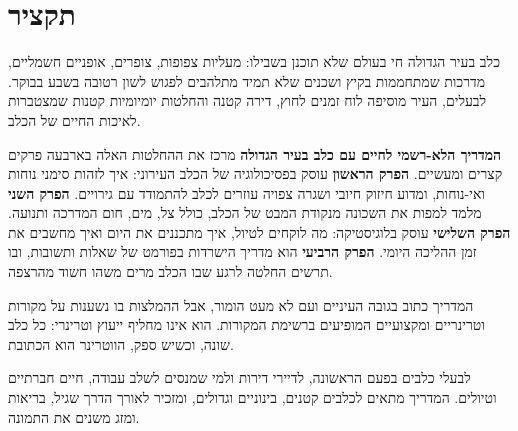 \chapter*{תקציר}
\thispagestyle{plain}

כלב בעיר הגדולה חי בעולם שלא תוכנן בשבילו: מעליות צפופות, צופרים, אופניים חשמליים,
מדרכות שמתחממות בקיץ ושכנים שלא תמיד מתלהבים לפגוש לשון רטובה בשבע בבוקר. לבעלים, העיר מוסיפה
לוח זמנים לחוץ, דירה קטנה והחלטות יומיומיות קטנות שמצטברות לאיכות החיים של הכלב.

\textbf{המדריך הלא-רשמי לחיים עם כלב בעיר הגדולה} מרכז את ההחלטות האלה בארבעה פרקים קצרים ומעשיים.
\textbf{הפרק הראשון} עוסק בפסיכולוגיה של הכלב העירוני: איך לזהות סימני נוחות ואי-נוחות, ומדוע חיזוק
חיובי ושגרה צפויה עוזרים לכלב להתמודד עם גירויים. \textbf{הפרק השני} מלמד למפות את השכונה
מנקודת המבט של הכלב, כולל צל, מים, חום המדרכה ותנועה. \textbf{הפרק השלישי} עוסק בלוגיסטיקה:
מה לוקחים לטיול, איך מתכננים את היום ואיך מחשבים את זמן ההליכה היומי. \textbf{הפרק הרביעי} הוא
מדריך הישרדות בפורמט של שאלות ותשובות, ובו תרשים החלטה לרגע שבו הכלב מרים משהו חשוד מהרצפה.

המדריך כתוב בגובה העיניים ועם לא מעט הומור, אבל ההמלצות בו נשענות על מקורות וטרינריים ומקצועיים
המופיעים ברשימת המקורות. הוא אינו מחליף ייעוץ וטרינרי: כל כלב שונה, וכשיש ספק, הווטרינר
הוא הכתובת.

\vfill
\begin{knowbox}
לבעלי כלבים בפעם הראשונה, לדיירי דירות ולמי שמנסים לשלב עבודה, חיים חברתיים וטיולים.
המדריך מתאים לכלבים קטנים, בינוניים וגדולים, ומזכיר לאורך הדרך שגיל, בריאות ומזג משנים את התמונה.
\end{knowbox}
\vfill
\clearpage
